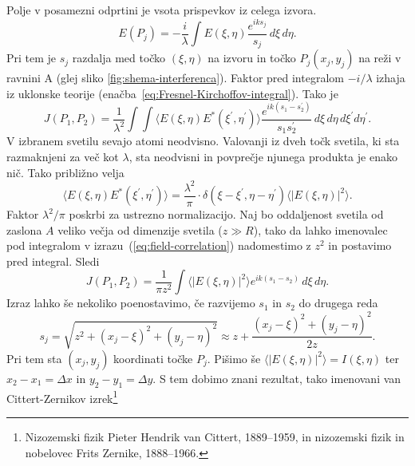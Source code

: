 Polje v posamezni odprtini je vsota prispevkov iz celega izvora.
\begin{equation}
E(P_{j})=-\frac{i}{\lambda}\int E(\xi,\eta)\frac{e^{iks_{j}}}{s_{j}}\, d\xi\, d\eta.
\end{equation}
Pri tem je $s_{j}$ razdalja med točko $(\xi,\eta)$ na izvoru in točko
$P_{j}(x_{j},y_{j})$ na reži v ravnini A (glej sliko \ref{fig:shema-interferenca}).
Faktor pred integralom $-i/\lambda$ izhaja iz uklonske teorije (enačba~\ref{eq:Fresnel-Kirchoffov-integral}).
Tako je 
\begin{equation}
J(P_{1},P_{2})=\frac{1}{\lambda^{2}}\int\int\langle E(\xi,\eta)E^{*}(\xi^{\prime},\eta^{\prime})\rangle\frac{e^{ik(s_{1}-s_{2}^{\prime})}}{s_{1}s_{2}^{\prime}}\, d\xi\, d\eta\, d\xi^{\prime}d\eta^{\prime}.\label{eq:field-correlation}
\end{equation}
V izbranem svetilu sevajo atomi neodvisno. Valovanji iz dveh točk svetila,
ki sta razmaknjeni za več kot $\lambda$, sta neodvisni in povprečje
njunega produkta je enako nič. Tako približno velja 
\begin{equation}
\langle E(\xi,\eta)E^{*}(\xi^{\prime},\eta^{\prime})\rangle=\frac{\lambda^{2}}{\pi} \cdot \delta(\xi-\xi^{\prime},\eta-\eta^{\prime})\langle|E(\xi,\eta)|^{2}\rangle.
\label{eq:delta-Zernike}
\end{equation}
Faktor $\lambda^{2}/\pi$ poskrbi za ustrezno normalizacijo. 
Naj bo oddaljenost svetila od zaslona $A$
veliko večja od dimenzije svetila ($z\gg R$), tako da lahko imenovalec pod integralom
v izrazu~(\ref{eq:field-correlation}) nadomestimo z $z^{2}$ in postavimo
pred integral. Sledi
\begin{equation}
J(P_{1},P_{2})=\frac{1}{\pi z^{2}}\int\langle|E(\xi,\eta)|^{2}\rangle e^{ik(s_{1}-s_{2})}\, d\xi\, d\eta.\label{eq:Zernike1}
\end{equation}
Izraz lahko še nekoliko poenostavimo, če razvijemo $s_{1}$
in $s_{2}$ do drugega reda
\begin{equation}
s_{j}=\sqrt{z^{2}+(x_{j}-\xi)^{2}+(y_{j}-\eta)^{2}}\approx z+\frac{(x_{j}-\xi)^{2}+(y_{j}-\eta)^{2}}{2z}.
\end{equation}
Pri tem sta $(x_{j},y_{j})$ koordinati točke $P_{j}$. Pišimo 
še $\langle|E(\xi,\eta)|^{2}\rangle=I(\xi,\eta)$ ter $x_{2}-x_{1}=\Delta x$
in $y_{2}-y_{1}=\Delta y$. S tem dobimo znani rezultat, tako imenovani 
van Cittert-Zernikov izrek\footnote{Nizozemski fizik Pieter Hendrik van Cittert, 1889--1959, in 
nizozemski fizik in nobelovec Frits Zernike, 1888--1966.}

